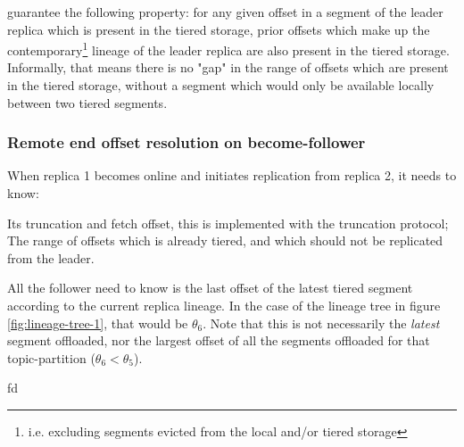 \documentclass{article}
\begin{document}
guarantee the following property: for any given offset in a segment of the leader replica which is present in the tiered storage, prior offsets which make up the contemporary\footnote{i.e. excluding segments evicted from the local and/or tiered storage} lineage of the leader replica are also present in the tiered storage. Informally, that means there is no "gap" in the range of offsets which are present in the tiered storage, without a segment which would only be available locally between two tiered segments.

\subsubsection{Remote end offset resolution on become-follower}

When replica 1 becomes online and initiates replication from replica 2, it needs to know:

\begin{outline}[enumerate]
\1 Its truncation and fetch offset, this is implemented with the truncation protocol;
\1 The range of offsets which is already tiered, and which should not be replicated from the leader.
\end{outline}


All the follower need to know is the last offset of the latest tiered segment according to the current replica lineage. In the case of the lineage tree in figure \ref{fig:lineage-tree-1}, that would be $\theta_6$. Note that this is not necessarily the \textit{latest} segment offloaded, nor the largest offset of all the segments offloaded for that topic-partition ($\theta_6 < \theta_5$).





fd

\newpage

{}
\end{document}

